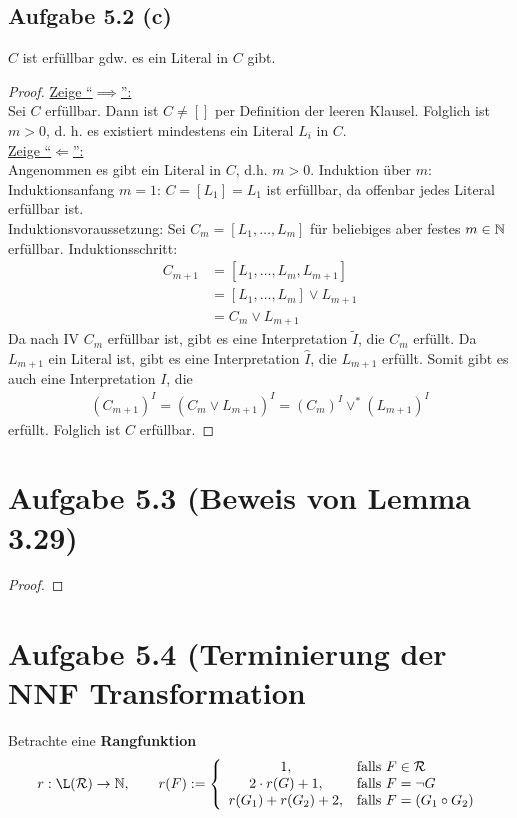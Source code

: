 \documentclass[12pt,a4paper]{article}
\newcommand{\RR}{\mathcal{R}}
\begin{document}
\subsection*{Aufgabe 5.2 (c)}
$C$ ist erfüllbar gdw. es ein Literal in $C$ gibt.
\begin{proof}
\underline{Zeige ``$\implies$'':}\\
Sei $C$ erfüllbar. Dann ist $C\neq[]$ per Definition der leeren Klausel. Folglich ist $m>0$, d. h. es existiert mindestens ein Literal $L_i$ in $C$.\\

\underline{Zeige ``$\Longleftarrow$'':}\\
Angenommen es gibt ein Literal in $C$, d.h. $m>0$.
Induktion über $m$:\\
Induktionsanfang $m=1$: $C=[L_1]=L_1$ ist erfüllbar, da offenbar jedes Literal erfüllbar ist.\\
Induktionsvoraussetzung: Sei $C_m=[L_1,\ldots,L_m]$ für beliebiges aber festes $m\in\mathbb{N}$ erfüllbar.
Induktionsschritt: 
\begin{align*}
C_{m+1}
&=[L_1,\ldots,L_m,L_{m+1}]\\
&=[L_1,\ldots,L_m]\vee L_{m+1}\\
&= C_{m}\vee L_{m+1}
\end{align*}
Da nach IV $C_m$ erfüllbar ist, gibt es eine Interpretation $\tilde{I}$, die $C_m$ erfüllt. Da $L_{m+1}$ ein Literal ist, gibt es eine Interpretation $\hat{I}$, die $L_{m+1}$ erfüllt. Somit gibt es auch eine Interpretation $I$, die 
\begin{align*}
(C_{m+1})^I=(C_{m}\vee L_{m+1})^I=(C_{m})^I\vee^\ast (L_{m+1})^I
\end{align*}
erfüllt. Folglich ist $C$ erfüllbar.
\end{proof}

\section*{Aufgabe 5.3 (Beweis von Lemma 3.29)}
\begin{proof}

\end{proof}

\section*{Aufgabe 5.4 (Terminierung der NNF Transformation}
Betrachte eine \textbf{Rangfunktion}
\begin{align*}
r:\L(\RR)\to\N,\qquad r(F):=\left\lbrace\begin{array}{cl}
1, &\falls F\in\RR\\
2\cdot r(G)+1, &\falls F=\neg G\\
r(G_1)+r(G_2)+2, &\falls F=(G_1\circ G_2)
\end{array}\right.
\end{align*}
\end{document}
